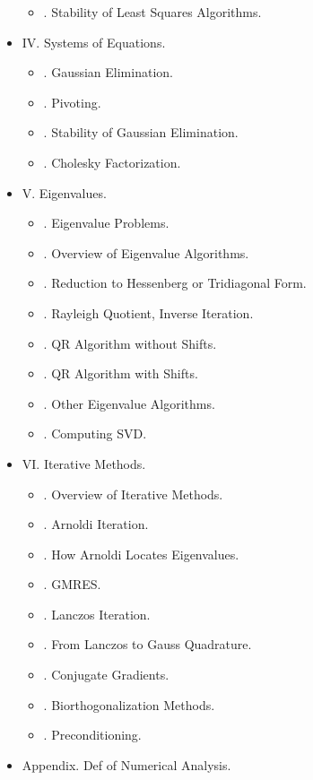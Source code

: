 \documentclass{article}
\begin{document}
\begin{itemize}
\begin{itemize}
		\item {. Stability of Least Squares Algorithms.}
	\end{itemize}
	\item {\sf IV. Systems of Equations.}
	\begin{itemize}
		\item {. Gaussian Elimination.}
		\item {. Pivoting.}
		\item {. Stability of Gaussian Elimination.}
		\item {. Cholesky Factorization.}
	\end{itemize}
	\item {\sf V. Eigenvalues.}
	\begin{itemize}
		\item {. Eigenvalue Problems.}
		\item {. Overview of Eigenvalue Algorithms.}
		\item {. Reduction to Hessenberg or Tridiagonal Form.}
		\item {. Rayleigh Quotient, Inverse Iteration.}
		\item {. QR Algorithm without Shifts.}
		\item {. QR Algorithm with Shifts.}
		\item {. Other Eigenvalue Algorithms.}
		\item {. Computing SVD.}
	\end{itemize}
	\item {\sf VI. Iterative Methods.}
	\begin{itemize}
		\item {. Overview of Iterative Methods.}
		\item {. Arnoldi Iteration.}
		\item {. How Arnoldi Locates Eigenvalues.}
		\item {. GMRES.}
		\item {. Lanczos Iteration.}
		\item {. From Lanczos to Gauss Quadrature.}
		\item {. Conjugate Gradients.}
		\item {. Biorthogonalization Methods.}
		\item {. Preconditioning.}
	\end{itemize}
	\item {\sf Appendix. Def of Numerical Analysis.}
\end{itemize}
\end{document}
